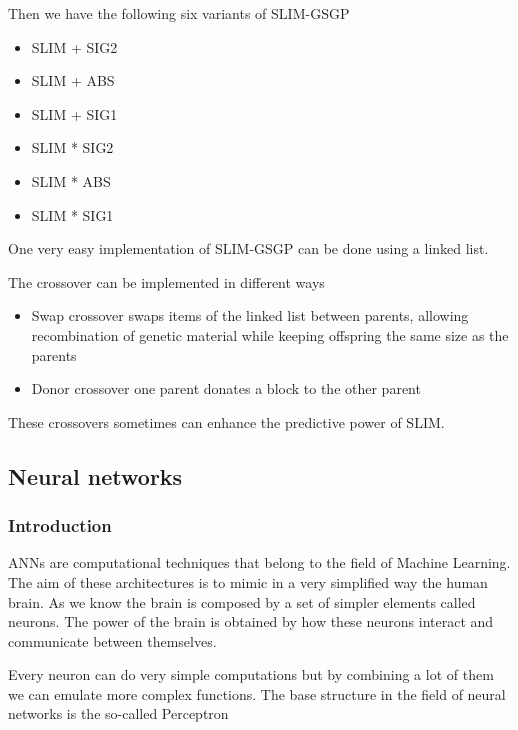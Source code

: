 Then we have the following six variants of SLIM-GSGP

\begin{itemize}
    \item SLIM + SIG2
    \item SLIM + ABS
    \item SLIM + SIG1
    \item SLIM * SIG2
    \item SLIM * ABS
    \item SLIM * SIG1
\end{itemize}

One very easy implementation of SLIM-GSGP can be done using a linked list. 

\vspace{10pt}

The crossover can be implemented in different ways

\begin{itemize}
    \item Swap crossover \ra swaps items of the linked list between parents, allowing recombination of genetic material while keeping offspring the same size as the parents
    \item Donor crossover \ra one parent donates a block to the other parent
\end{itemize}


These crossovers sometimes can enhance the predictive power of SLIM. 

\subsection{Neural networks}

\subsubsection{Introduction}

ANNs are computational techniques that belong to the field of Machine Learning. The aim of these architectures is to mimic in a very simplified way the human brain. As we know the brain is composed by a set of simpler elements called neurons. The power of the brain is obtained by how these neurons interact and communicate between themselves. 

\vspace{10pt}

Every neuron can do very simple computations but by combining a lot of them we can emulate more complex functions. The base structure in the field of neural networks is the so-called Perceptron


